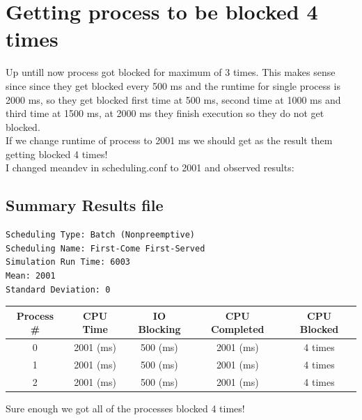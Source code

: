 \section{Getting process to be blocked 4 times}
Up untill now process got blocked for maximum of 3 times. This makes sense since
since they get blocked every 500 ms and the runtime for single process is 2000
ms, so they get blocked first time at 500 ms, second time at 1000 ms and third
time at 1500 ms, at 2000 ms they finish execution so they do not get blocked. \\
If we change runtime of process to 2001 ms we should get as the result them
getting blocked 4 times! \\
I changed meandev in scheduling.conf to 2001 and observed results:
\subsection{Summary Results file}
\begin{lstlisting}
Scheduling Type: Batch (Nonpreemptive)
Scheduling Name: First-Come First-Served
Simulation Run Time: 6003
Mean: 2001
Standard Deviation: 0
\end{lstlisting}
\begin{center}
	\begin{tabular}{| c | c | c | c | c |}
		\hline
		Process \#&	CPU Time&	IO Blocking&	CPU Completed&
		CPU Blocked \\ \hline
		0	&	2001 (ms)&	500 (ms)&	2001 (ms)&
		4 times  \\ \hline
		1	&	2001 (ms)&	500 (ms)&	2001 (ms)&
		4 times \\ \hline
		2	&	2001 (ms)&	500 (ms)&	2001 (ms)&
		4 times \\ \hline
\end{tabular}
\end{center}
Sure enough we got all of the processes blocked 4 times!
